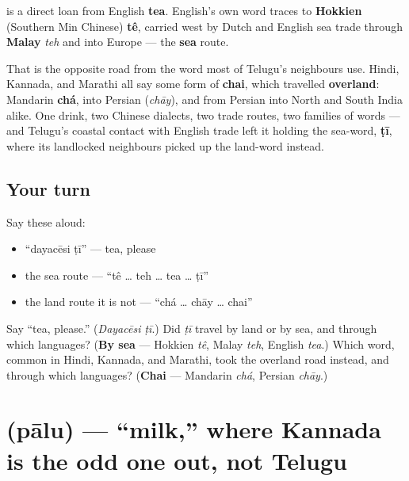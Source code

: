 \begin{cousinweb}
\textbf{} is a direct loan from English \textbf{tea}. English's own word traces to \textbf{Hokkien} (Southern Min Chinese) \textbf{tê}, carried west by Dutch and English sea trade through \textbf{Malay} \emph{teh} and into Europe — the \textbf{sea} route.

That is the opposite road from the word most of Telugu's neighbours use. Hindi, Kannada, and Marathi all say some form of \textbf{chai}, which travelled \textbf{overland}: Mandarin \textbf{chá}, into Persian \textbf{} (\emph{chāy}), and from Persian into North and South India alike. One drink, two Chinese dialects, two trade routes, two families of words — and Telugu's coastal contact with English trade left it holding the sea-word, \textbf{ṭī}, where its landlocked neighbours picked up the land-word instead.
\end{cousinweb}

\subsection*{Your turn}
Say these aloud:

\begin{itemize}
\raggedright
  \item \textquotedblleft{}dayacēsi ṭī\textquotedblright{} — tea, please
  \item the sea route — \textquotedblleft{}tê … teh … tea … ṭī\textquotedblright{}
  \item the land route it is not — \textquotedblleft{}chá … chāy … chai\textquotedblright{}
\end{itemize}

\begin{tcolorbox}[breakable,colback=teal!4,colframe=teal!35!black,title={Before you move on}]
Say \textquotedblleft{}tea, please.\textquotedblright{} (\emph{Dayacēsi ṭī}.) Did \emph{ṭī} travel by land or by sea, and through which languages? (\textbf{By sea} — Hokkien \emph{tê}, Malay \emph{teh}, English \emph{tea}.) Which word, common in Hindi, Kannada, and Marathi, took the overland road instead, and through which languages? (\textbf{Chai} — Mandarin \emph{chá}, Persian \emph{chāy}.)
\end{tcolorbox}
\section[pālu]{ (pālu) — \textquotedblleft{}milk,\textquotedblright{} where Kannada is the odd one out, not Telugu}


